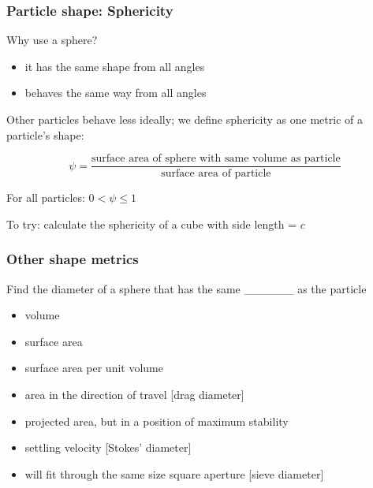 \begin{frame}\frametitle{Particle shape: Sphericity}
	Why use a sphere?
	\begin{itemize}
		\item	it has the same shape from all angles
		\item	behaves the same way from all angles
	\end{itemize}
	
	Other particles behave less ideally; we define sphericity as one metric of a particle's shape:
	
	
	\[
		\psi = \frac{\text{surface area of sphere with same volume as particle}}{\text{surface area of particle}}
	\]
	
	\vspace{12pt}
	For all particles: \( 0 < \psi \leq 1 \)
	
	\vspace{12pt}
	To try: calculate the sphericity of a cube with side length = $c$ \\ {\scriptsize {\color{myGreen}{Answer: $\psi = 0.806$}}}	
\end{frame}

\begin{frame}\frametitle{Other shape metrics}
	Find the diameter of a sphere that has the same \_\_\_\_\_\_ as the particle
	\begin{itemize}
		\item	volume
		\item	surface area
		\item	surface area per unit volume
		\item	area in the direction of travel [drag diameter]
		\item	projected area, but in a position of maximum stability
		\item	settling velocity [Stokes' diameter]
		\item	will fit through the same size square aperture  [sieve diameter]
	\end{itemize}
\end{frame}

